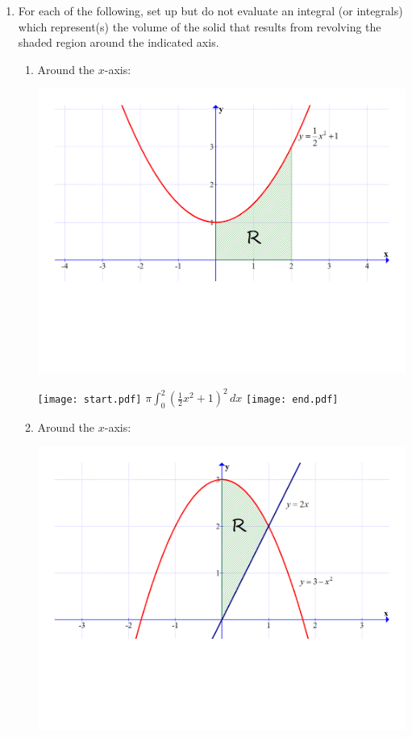 \documentclass[12pt]{article}
\begin{document}
\begin{enumerate}

\item For each of the following, set up but do not evaluate an integral (or integrals) which represent(s) the volume of the solid that results from revolving the shaded region around the indicated axis.

\begin{enumerate}

\item Around the $x$-axis:

\begin{center}

\includegraphics[scale=0.5]{graph1.pdf}

\end{center}

\texttt{[image: start.pdf]}
{{$\pi\int_0^2 \left(\frac{1}{2}x^2+1\right)^2 \,dx$}}
\texttt{[image: end.pdf]}


\newpage

\item Around the $x$-axis:

\begin{center}

\includegraphics[scale=0.4]{graph2.pdf}


\end{center}
\end{enumerate}
\end{enumerate}
\end{document}
